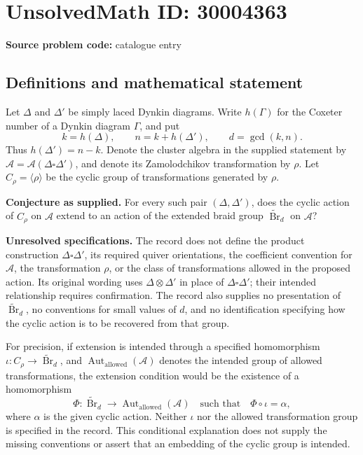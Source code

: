 \documentclass[11pt]{article}
\begin{document}
\section*{UnsolvedMath ID: 30004363}
\textbf{Source problem code:} catalogue entry
\subsection{Definitions and mathematical statement}
Let \(\Delta\) and \(\Delta'\) be simply laced Dynkin diagrams. Write \(h(\Gamma)\) for the Coxeter number of a Dynkin diagram \(\Gamma\), and put
\[
k=h(\Delta),\qquad n=k+h(\Delta'),\qquad d=\gcd(k,n).
\]
Thus \(h(\Delta')=n-k\). Denote the cluster algebra in the supplied statement by \(\mathcal A=\mathcal A(\Delta\square\Delta')\), and denote its Zamolodchikov transformation by \(\rho\). Let \(C_\rho=\langle\rho\rangle\) be the cyclic group of transformations generated by \(\rho\).

\textbf{Conjecture as supplied.} For every such pair \((\Delta,\Delta')\), does the cyclic action of \(C_\rho\) on \(\mathcal A\) extend to an action of the extended braid group \(\widetilde{\operatorname{Br}}_d\) on \(\mathcal A\)?

\textbf{Unresolved specifications.} The record does not define the product construction \(\Delta\square\Delta'\), its required quiver orientations, the coefficient convention for \(\mathcal A\), the transformation \(\rho\), or the class of transformations allowed in the proposed action. Its original wording uses \(\Delta\otimes\Delta'\) in place of \(\Delta\square\Delta'\); their intended relationship requires confirmation. The record also supplies no presentation of \(\widetilde{\operatorname{Br}}_d\), no conventions for small values of \(d\), and no identification specifying how the cyclic action is to be recovered from that group.

For precision, if extension is intended through a specified homomorphism \(\iota:C_\rho\to\widetilde{\operatorname{Br}}_d\), and \(\operatorname{Aut}_{\mathrm{allowed}}(\mathcal A)\) denotes the intended group of allowed transformations, the extension condition would be the existence of a homomorphism
\[
\Phi:\widetilde{\operatorname{Br}}_d\longrightarrow
\operatorname{Aut}_{\mathrm{allowed}}(\mathcal A)
\quad\text{such that}\quad
\Phi\circ\iota=\alpha,
\]
where \(\alpha\) is the given cyclic action. Neither \(\iota\) nor the allowed transformation group is specified in the record. This conditional explanation does not supply the missing conventions or assert that an embedding of the cyclic group is intended.
\end{document}
